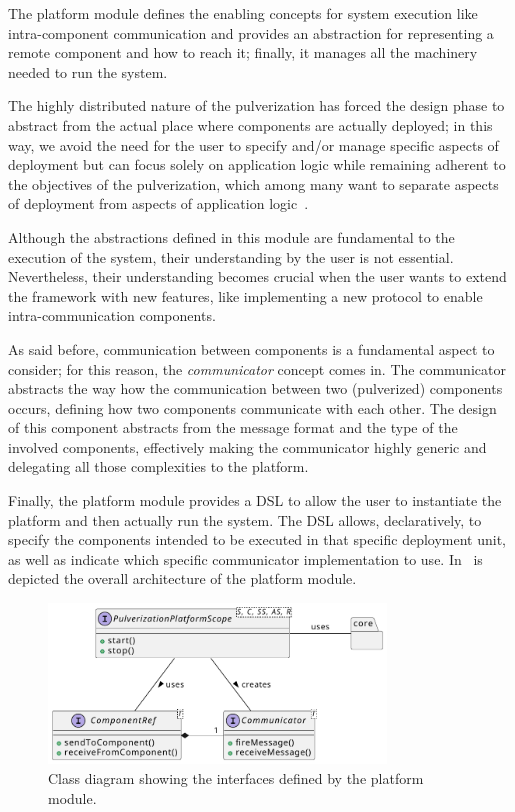 The platform module defines the enabling concepts for system execution like intra-component communication and provides an abstraction for
representing a remote component and how to reach it; finally, it manages all the machinery needed to run the system.

The highly distributed nature of the pulverization has forced the design phase to abstract from the actual place where components are actually
deployed; in this way, we avoid the need for the user to specify and/or manage specific aspects of deployment but can focus solely on
application logic while remaining adherent to the objectives of the pulverization, which among many want to separate aspects of
deployment from aspects of application logic~\cite{fi12110203}.

Although the abstractions defined in this module are fundamental to the execution of the system, their understanding by the user is not essential.
Nevertheless, their understanding becomes crucial when the user wants to extend the framework with new features, like implementing a new protocol to
enable intra-communication components.

As said before, communication between components is a fundamental aspect to consider; for this reason, the \emph{communicator} concept comes in.
The communicator abstracts the way how the communication between two (pulverized) components occurs, defining how two components communicate with
each other. The design of this component abstracts from the message format and the type of the involved components, effectively making the
communicator highly generic and delegating all those complexities to the platform.

Finally, the platform module provides a DSL to allow the user to instantiate the platform and then actually run the system.
The DSL allows, declaratively, to specify the components intended to be executed in that specific deployment unit, as well as indicate which
specific communicator implementation to use. In~ is depicted the overall architecture of the platform module.

\begin{figure}
	\centering
	\includegraphics[width=0.8\textwidth]{figures/platform-design-interfaces.pdf}
	\caption{Class diagram showing the interfaces defined by the platform module.}
	\label{fig:platform-module-architecture}
\end{figure}

